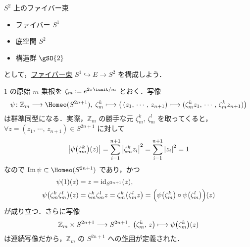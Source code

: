 \documentclass[algtopo_main]{subfiles}
\begin{document}

\begin{myexample}[]{$S^2$ 上のファイバー束}
    \begin{itemize}
        \item ファイバー $S^1$
        \item 底空間 $S^2$
        \item 構造群 $\gSO{2}$ 
    \end{itemize}
    として，\hyperref[def:FB]{ファイバー束} $S^1 \hookrightarrow E \to S^2$ を構成しよう．

    $1$ の原始 $m$ 乗根を $\zeta_m \coloneqq e^{2\pi \iunit / m}$ とおく．写像
    \begin{align}
        \psi \colon \mathbb{Z}_m \lto \Homeo(S^{2n+1}),\; \zeta_m^k \lmto \bigl(\,(z_1,\, \cdots,\, z_{n+1}) \lmto (\zeta_m^k z_1,\, \cdots,\, \zeta_m^k z_{n+1}) \bigr) 
    \end{align}
    は群準同型になる．実際，$\mathbb{Z}_m$ の勝手な元 $\zeta_m^k,\, \zeta_m^l$ を取ってくると， $\forall z = (z_1,\, \cdots,\, z_{n+1}) \in S^{2n+1}$ に対して
    \begin{align}
        \abs{\psi \bigl( \zeta_m^k \bigr) (z)} = \sum_{i=1}^{n+1} \abs{\zeta_m^k z_{i}}^2 = \sum_{i=1}^{n+1} \abs{z_i}^2 = 1
    \end{align}
    なので $\Im \psi \subset \Homeo(S^{2n+1})$ であり，かつ
    \begin{align}
        \psi (1) (z) &= z = \mathrm{id}_{S^{2n+1}} (z),\\
        \psi \bigl( \zeta_m^k \zeta_m^l \bigr) (z) &= \zeta_m^k \zeta_m^l z = \zeta_m^k \bigl(\zeta_m^l z\bigr) = \Bigl(\psi \bigl( \zeta_m^k \bigr) \circ \psi \bigl( \zeta_m^l \bigr)\Bigr)(z)
    \end{align}
    が成り立つ．さらに写像
    \begin{align}
        \mathbb{Z}_m \times S^{2n+1} \longrightarrow S^{2n+1},\; \bigl(\zeta_m^k,\, z\bigr) \longmapsto \psi \bigl( \zeta_m^k \bigr) (z)
    \end{align}
    は連続写像だから，$\mathbb{Z}_m$ の $S^{2n+1}$ への\hyperref[def:TG-action]{作用}が定義された．


\end{myexample}
\end{document}
